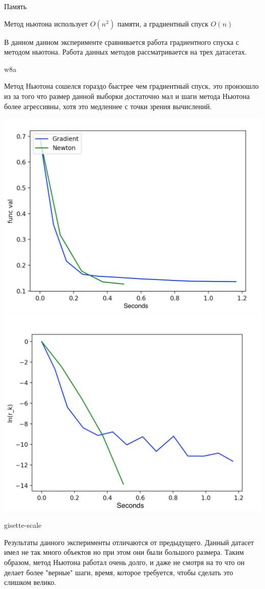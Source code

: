 \documentclass{article}
\theoremstyle{definition}
\theoremstyle{remark}
\begin{document}
Память

Метод ньютона использует $O(n^2)$ памяти, а градиентный спуск $O(n)$



В данном данном эксперименте сравнивается работа градиентного спуска с методом ньютона. Работа данных методов рассматривается на трех датасетах.


w8a

Метод Ньютона сошелся гораздо быстрее чем градиентный спуск, это произошло из за того что размер данной выборки достаточно мал и шаги метода Ньютона более агрессивны, хотя это медленнее с точки зрения вычислений.

\includegraphics[width=0.6 \textwidth]{31.png}
\includegraphics[width=0.6 \textwidth]{32.png}

gisette-scale

Результаты данного эксперименты отличаются от предыдущего. Данный датасет имел не так много объектов но при этом они были большого размера. Таким образом, метод Ньютона работал очень долго, и даже не смотря на то что он делает более "верные" шаги, время, которое требуется, чтобы сделать это слишком велико.
\end{document}
